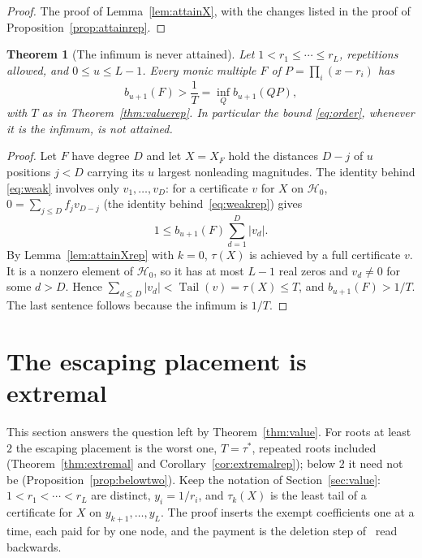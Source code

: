 \documentclass[11pt]{article}
\newtheorem{theorem}{Theorem}[section]
\theoremstyle{definition}
\theoremstyle{plain}
\DeclareMathOperator{\Tail}{Tail}
\begin{document}
\begin{proof}
The proof of Lemma~\ref{lem:attainX}, with the changes listed in the proof
of Proposition~\ref{prop:attainrep}.
\end{proof}

\begin{theorem}[The infimum is never attained]\label{thm:noattain}
Let $1<r_1\le\cdots\le r_L$, repetitions allowed, and $0\le u\le L-1$.  Every
monic multiple $F$ of $P=\prod_i(x-r_i)$ has
\[
  b_{u+1}(F)>\frac1T=\inf_Qb_{u+1}(QP),
\]
with $T$ as in Theorem~\ref{thm:valuerep}.  In particular the
bound \eqref{eq:order}, whenever it is the infimum, is not attained.
\end{theorem}

\begin{proof}
Let $F$ have degree $D$ and let $X=X_F$ hold the distances $D-j$ of $u$
positions $j<D$ carrying its $u$ largest nonleading magnitudes.  The identity
behind \eqref{eq:weak} involves only $v_1,\ldots,v_D$: for a certificate $v$
for $X$ on $\mathcal H_0$, $0=\sum_{j\le D}f_jv_{D-j}$ (the identity
behind~\eqref{eq:weakrep}) gives
\[
  1\le b_{u+1}(F)\sum_{d=1}^{D}|v_d| .
\]
By Lemma~\ref{lem:attainXrep} with $k=0$, $\tau(X)$ is achieved by a
full certificate $v$.  It is a nonzero element of $\mathcal H_0$, so it has
at most $L-1$ real zeros and $v_d\ne0$ for some $d>D$.  Hence
$\sum_{d\le D}|v_d|<\Tail(v)=\tau(X)\le T$, and $b_{u+1}(F)>1/T$.  The last
sentence follows because the infimum is $1/T$.
\end{proof}

\section{The escaping placement is extremal}\label{sec:extremal}

This section answers the question left by Theorem~\ref{thm:value}.  For roots
at least $2$ the escaping placement is the worst one, $T=\tau^*$, repeated
roots included (Theorem~\ref{thm:extremal} and
Corollary~\ref{cor:extremalrep}); below $2$ it need not be
(Proposition~\ref{prop:belowtwo}).  Keep the notation of
Section~\ref{sec:value}: $1<r_1<\cdots<r_L$ are distinct, $y_i=1/r_i$, and
$\tau_k(X)$ is the least tail of a certificate for $X$ on
$y_{k+1},\ldots,y_L$.  The
proof inserts the exempt coefficients one at a time, each paid for by one
node, and the payment is the deletion step of~\cite[Theorem~2.2]{coefficient-mass} read backwards.
\end{document}
